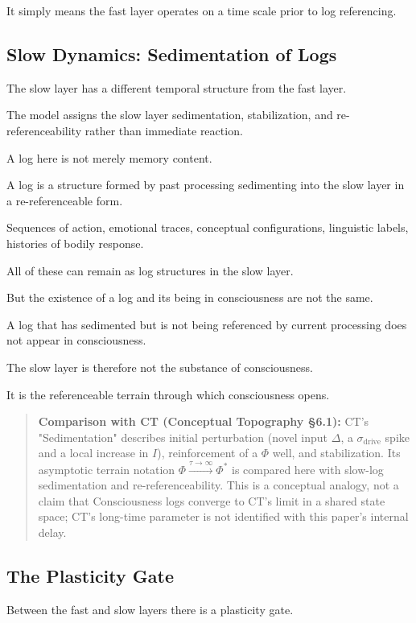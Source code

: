 It simply means the fast layer operates on a time scale prior to log referencing.

\subsection{Slow Dynamics: Sedimentation of Logs}


The slow layer has a different temporal structure from the fast layer.

The model assigns the slow layer sedimentation, stabilization, and re-referenceability rather than immediate reaction.

A log here is not merely memory content.

A log is a structure formed by past processing sedimenting into the slow layer in a re-referenceable form.

Sequences of action, emotional traces, conceptual configurations, linguistic labels, histories of bodily response.

All of these can remain as log structures in the slow layer.

But the existence of a log and its being in consciousness are not the same.

A log that has sedimented but is not being referenced by current processing does not appear in consciousness.

The slow layer is therefore not the substance of consciousness.

It is the referenceable terrain through which consciousness opens.

\begin{quote}
\textbf{Comparison with CT (Conceptual Topography §6.1):} CT's "Sedimentation" describes initial perturbation (novel input $\Delta$, a $\sigma_{\text{drive}}$ spike and a local increase in $I$), reinforcement of a $\Phi$ well, and stabilization. Its asymptotic terrain notation $\Phi \xrightarrow{\tau\to\infty} \Phi^*$ is compared here with slow-log sedimentation and re-referenceability. This is a conceptual analogy, not a claim that Consciousness logs converge to CT's limit in a shared state space; CT's long-time parameter is not identified with this paper's internal delay.
\end{quote}

\subsection{The Plasticity Gate}


Between the fast and slow layers there is a plasticity gate.


